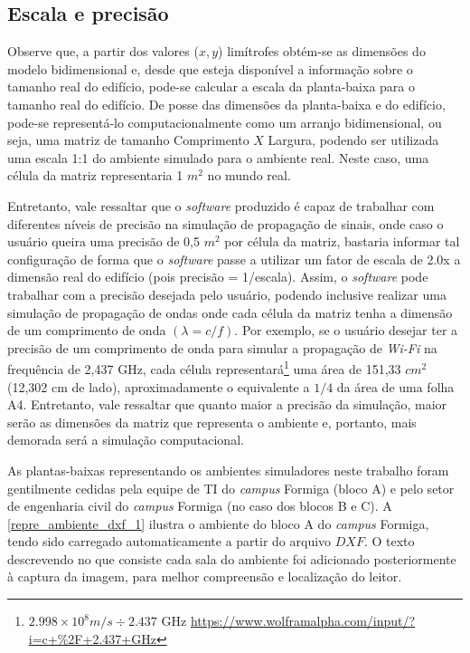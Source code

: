 \documentclass[
	12pt,				%
	twoside,			%
	a4paper,			%
	english,			%
	french,				%
	spanish,			%
	brazil				%
	]{abntex2}
\begin{document}
\subsection{Escala e precisão}\label{escala-e-precisuxe3o}

Observe que, a partir dos valores (\(x, y\)) limítrofes obtém-se as
dimensões do modelo bidimensional e, desde que esteja disponível a
informação sobre o tamanho real do edifício, pode-se calcular a escala
da planta-baixa para o tamanho real do edifício. De posse das dimensões
da planta-baixa e do edifício, pode-se representá-lo computacionalmente
como um arranjo bidimensional, ou seja, uma matriz de tamanho
Comprimento \(X\) Largura, podendo ser utilizada uma escala 1:1 do
ambiente simulado para o ambiente real. Neste caso, uma célula da matriz
representaria 1 \(m^{2}\) no mundo real.

Entretanto, vale ressaltar que o \emph{software} produzido é capaz de
trabalhar com diferentes níveis de precisão na simulação de propagação
de sinais, onde caso o usuário queira uma precisão de 0,5 \(m^{2}\) por
célula da matriz, bastaria informar tal configuração de forma que o
\emph{software} passe a utilizar um fator de escala de 2.0x a dimensão
real do edifício (pois precisão = 1/escala). Assim, o \emph{software}
pode trabalhar com a precisão desejada pelo usuário, podendo inclusive
realizar uma simulação de propagação de ondas onde cada célula da matriz
tenha a dimensão de um comprimento de onda \((\lambda = c/f)\). Por
exemplo, se o usuário desejar ter a precisão de um comprimento de onda
para simular a propagação de \emph{Wi-Fi} na frequência de 2,437 GHz,
cada célula representará\footnote{\(2.998\times10^{8} m/s \div 2.437\)
  GHz \url{https://www.wolframalpha.com/input/?i=c+\%2F+2.437+GHz}} uma
área de 151,33 \(cm^{2}\) (12,302 cm de lado), aproximadamente o
equivalente a \(1/4\) da área de uma folha A4. Entretanto, vale
ressaltar que quanto maior a precisão da simulação, maior serão as
dimensões da matriz que representa o ambiente e, portanto, mais demorada
será a simulação computacional.

As plantas-baixas representando os ambientes simuladores neste trabalho
foram gentilmente cedidas pela equipe de TI do \emph{campus} Formiga
(bloco A) e pelo setor de engenharia civil do \emph{campus} Formiga (no
caso dos blocos B e C). A \autoref{repre_ambiente_dxf_1} ilustra o
ambiente do bloco A do \emph{campus} Formiga, tendo sido carregado
automaticamente a partir do arquivo \(DXF\). O texto descrevendo no que
consiste cada sala do ambiente foi adicionado posteriormente à captura
da imagem, para melhor compreensão e localização do leitor.
\end{document}
